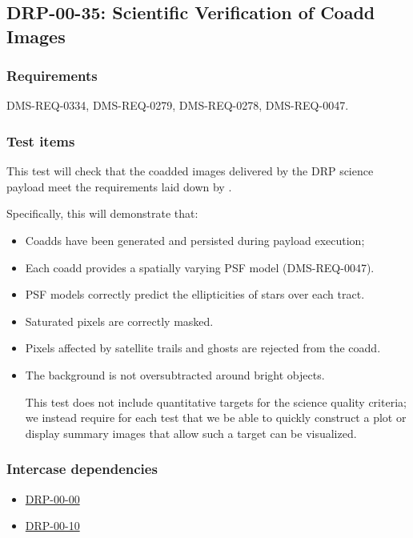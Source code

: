\subsection{DRP-00-35: Scientific Verification of Coadd Images}
\label{drp-00-35}

\subsubsection{Requirements}

DMS-REQ-0334, DMS-REQ-0279, DMS-REQ-0278, DMS-REQ-0047.

\subsubsection{Test items}
\label{drp-00-35-items}

This test will check that the coadded images  delivered by the DRP science
payload meet the requirements laid down by .

Specifically, this will demonstrate that:

\begin{itemize}

  \item{Coadds have been generated and persisted during payload execution;}
  \item{Each coadd provides a spatially varying PSF model (DMS-REQ-0047).}
  \item{PSF models correctly predict the ellipticities of stars over each
  tract.}
  \item{Saturated pixels are correctly masked.}
  \item{Pixels affected by satellite trails and ghosts are rejected from the coadd.}
  \item{The background is not oversubtracted around bright objects.}

This test does not include quantitative targets for the science quality criteria; we instead require for each test that we be able to quickly construct a plot or display summary images that allow such a target can be visualized.

\end{itemize}

\subsubsection{Intercase dependencies}

\begin{itemize}

  \item{\hyperref[drp-00-00]{DRP-00-00}}
  \item{\hyperref[drp-00-10]{DRP-00-10}}

\end{itemize}

